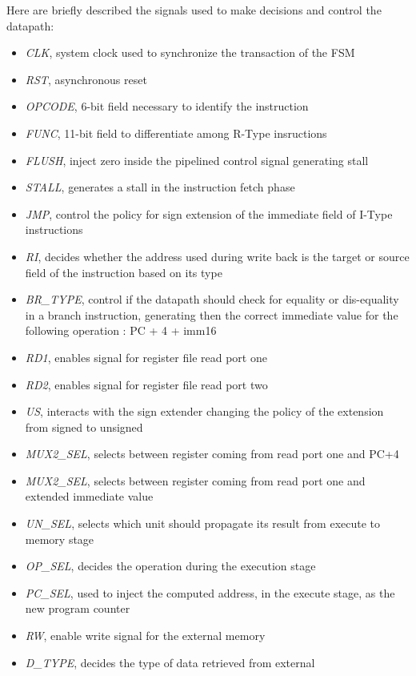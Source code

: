 Here are briefly described the signals used to make decisions and control
the datapath: 
\begin{itemize}
	\item \textit{CLK}, system clock used to synchronize the transaction of 
	      the FSM
	\item \textit{RST}, asynchronous reset 
	\item \textit{OPCODE}, 6-bit field necessary to identify the instruction
	\item \textit{FUNC}, 11-bit field to differentiate among R-Type insructions
	\item \textit{FLUSH}, inject zero inside the pipelined control signal
	      generating stall
	\item \textit{STALL}, generates a stall in the instruction fetch phase
	\item \textit{JMP}, control the policy for sign extension of the immediate 
		  field of I-Type instructions
	\item \textit{RI}, decides whether the address used during write back is
		  the target or source field of the instruction based on its type
	\item \textit{BR\_TYPE}, control if the datapath should check for equality
		  or dis-equality in a branch instruction, generating then the correct
		  immediate value for the following operation : PC + 4 + imm16
	\item \textit{RD1}, enables signal for register file read port one
	\item \textit{RD2}, enables signal for register file read port two
	\item \textit{US}, interacts with the sign extender changing the policy of 
		  the extension from signed to unsigned
	\item \textit{MUX2\_SEL}, selects between register coming from read port one
		  and PC+4
	\item \textit{MUX2\_SEL}, selects between register coming from read port one
		  and extended immediate value
	\item \textit{UN\_SEL}, selects which unit should propagate its result from 
		  execute to memory stage
	\item \textit{OP\_SEL}, decides the operation during the execution stage
	\item \textit{PC\_SEL}, used to inject the computed address, in the execute
	      stage, as the new program counter
	\item \textit{RW}, enable write signal for the external memory
	\item \textit{D\_TYPE}, decides the type of data retrieved from external

\end{itemize}

